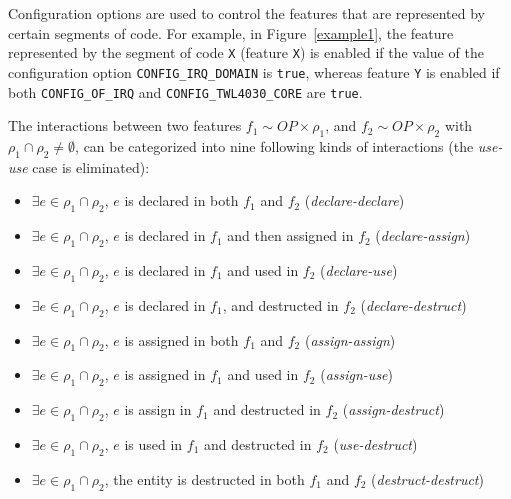 Configuration options are used to control the features that are
represented by certain segments of code. For example, in
Figure~\ref{example1}, the feature represented by the segment of code
\texttt{X} (feature \texttt{X}) is enabled if the value of
the configuration option \texttt{CONFIG\_IRQ\_DOMAIN} is \texttt{true},
whereas feature \texttt{Y} is enabled if both \texttt{CONFIG\_OF\_IRQ} and \texttt{CONFIG\_\-TWL4030\_CORE} are \texttt{true}.


The interactions between two features $f_1 \sim OP \times \rho_1$, and
$f_2 \sim OP \times \rho_2$ with $\rho_1 \cap \rho_2 \neq \emptyset$,
can be categorized into nine following kinds of interactions (the
\textit{use-use} case is eliminated):

\begin{itemize}

\item $\exists e \in \rho_1 \cap \rho_2$, $e$ is declared in both $f_1$ and $f_2$ (\textit{declare-declare})

\item $\exists e \in \rho_1 \cap \rho_2$, $e$ is declared in $f_1$ and then assigned in $f_2$ (\textit{declare-assign})

\item $\exists e \in \rho_1 \cap \rho_2$, $e$ is declared in $f_1$ and used in $f_2$ (\textit{declare-use})

\item $\exists e \in \rho_1 \cap \rho_2$, $e$ is declared in $f_1$, and destructed in $f_2$ (\textit{declare-destruct})

\item $\exists e \in \rho_1 \cap \rho_2$, $e$ is assigned in both $f_1$ and $f_2$ (\textit{assign-assign})

\item $\exists e \in \rho_1 \cap \rho_2$, $e$ is assigned in $f_1$ and used in $f_2$ (\textit{assign-use})

\item $\exists e \in \rho_1 \cap \rho_2$, $e$ is assign in $f_1$ and destructed in $f_2$ (\textit{assign-destruct})

\item $\exists e \in \rho_1 \cap \rho_2$, $e$ is used in $f_1$ and destructed in $f_2$ (\textit{use-destruct})

\item $\exists e \in \rho_1 \cap \rho_2$, the entity is destructed in both $f_1$ and $f_2$ (\textit{destruct-destruct})


\end{itemize}


